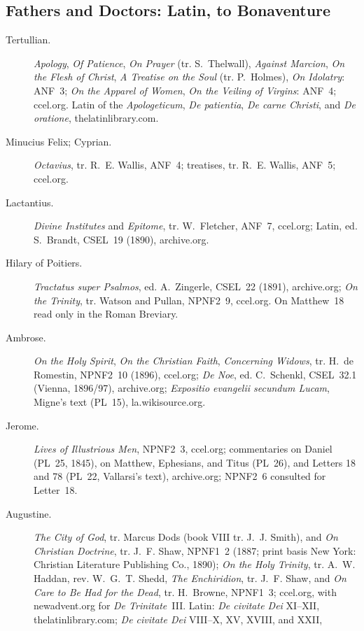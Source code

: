 \subsection*{Fathers and Doctors: Latin, to Bonaventure}
\begin{description}
\item[Tertullian.] \emph{Apology}, \emph{Of Patience}, \emph{On Prayer}
  (tr. S.~Thelwall), \emph{Against Marcion}, \emph{On the Flesh of
  Christ}, \emph{A Treatise on the Soul} (tr. P.~Holmes), \emph{On
  Idolatry}: ANF~3; \emph{On the Apparel of Women}, \emph{On the Veiling of
  Virgins}: ANF~4; ccel.org. Latin of the \emph{Apologeticum}, \emph{De
  patientia}, \emph{De carne Christi}, and \emph{De oratione},
  thelatinlibrary.com.
\item[Minucius Felix; Cyprian.] \emph{Octavius}, tr. R.~E. Wallis, ANF~4;
  treatises, tr. R.~E. Wallis, ANF~5; ccel.org.
\item[Lactantius.] \emph{Divine Institutes} and \emph{Epitome}, tr.
  W.~Fletcher, ANF~7, ccel.org; Latin, ed. S.~Brandt, CSEL~19 (1890),
  archive.org.
\item[Hilary of Poitiers.] \emph{Tractatus super Psalmos}, ed.
  A.~Zingerle, CSEL~22 (1891), archive.org; \emph{On the Trinity}, tr.
  Watson and Pullan, NPNF2~9, ccel.org. On Matthew~18 read only in the
  Roman Breviary.
\item[Ambrose.] \emph{On the Holy Spirit}, \emph{On the Christian Faith},
  \emph{Concerning Widows}, tr. H.~de Romestin, NPNF2~10 (1896), ccel.org;
  \emph{De Noe}, ed. C.~Schenkl, CSEL~32.1 (Vienna, 1896/97), archive.org;
  \emph{Expositio evangelii secundum Lucam}, Migne's text (PL~15),
  la.wikisource.org.
\item[Jerome.] \emph{Lives of Illustrious Men}, NPNF2~3, ccel.org;
  commentaries on Daniel (PL~25, 1845), on Matthew, Ephesians, and Titus
  (PL~26), and Letters 18 and 78 (PL~22, Vallarsi's text), archive.org;
  NPNF2~6 consulted for Letter~18.
\item[Augustine.] \emph{The City of God}, tr. Marcus Dods (book VIII tr.
  J.~J. Smith), and \emph{On Christian Doctrine}, tr. J.~F. Shaw, NPNF1~2
  (1887; print basis New York: Christian Literature Publishing Co., 1890);
  \emph{On the Holy Trinity}, tr. A.~W. Haddan, rev. W.~G.~T. Shedd,
  \emph{The Enchiridion}, tr. J.~F. Shaw, and \emph{On Care to Be Had for
  the Dead}, tr. H.~Browne, NPNF1~3; ccel.org, with newadvent.org for
  \emph{De Trinitate}~III. Latin: \emph{De civitate Dei} XI--XII,
  thelatinlibrary.com; \emph{De civitate Dei} VIII--X, XV, XVIII, and XXII,

\end{description}
